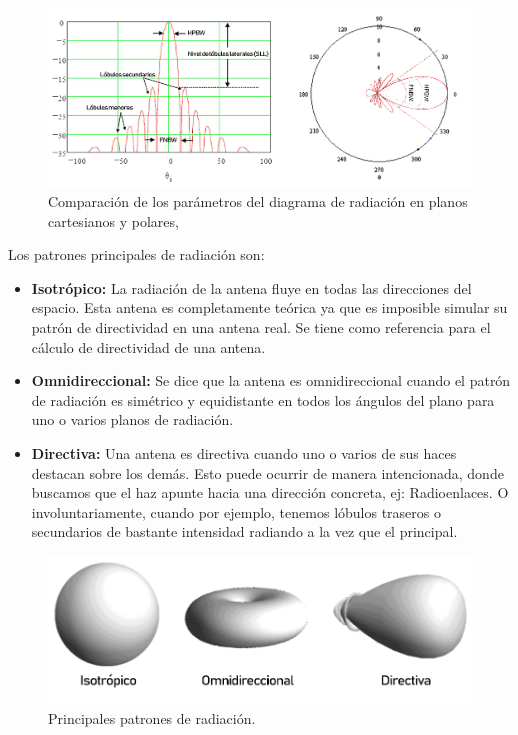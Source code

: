 \begin{figure}[h]
    \centering
        \includegraphics[width=16cm]{archivos/radiacion/pat3}
        \caption{Comparación de los parámetros del diagrama de radiación en planos cartesianos y polares, \cite{Cardama2002}}
        \label{fig:carte}
\end{figure}
\par Los patrones principales de radiación son:

\begin{itemize}
\item \textbf{Isotrópico: }La radiación de la antena fluye en todas las direcciones del espacio. Esta antena es completamente teórica ya que es imposible simular su patrón de directividad en una antena real. Se tiene como referencia para el cálculo de directividad de una antena.
\item \textbf{Omnidireccional: }Se dice que la antena es omnidireccional cuando el patrón de radiación es simétrico y equidistante en todos los ángulos del plano para uno o varios planos de radiación.
\item \textbf{Directiva: }Una antena es directiva cuando uno o varios de sus haces destacan sobre los demás. Esto puede ocurrir de manera intencionada, donde buscamos que el haz apunte hacia una dirección concreta, ej: Radioenlaces. O involuntariamente, cuando por ejemplo, tenemos lóbulos traseros o secundarios de bastante intensidad radiando a la vez que el principal. 
\end{itemize}

\begin{figure}[h]
    \centering
        \includegraphics[width=15cm]{archivos/radiacion/patrones}
        \caption{Principales patrones de radiación. \cite{Cardama2002} }
        \label{fig:prinrad}
\end{figure}
